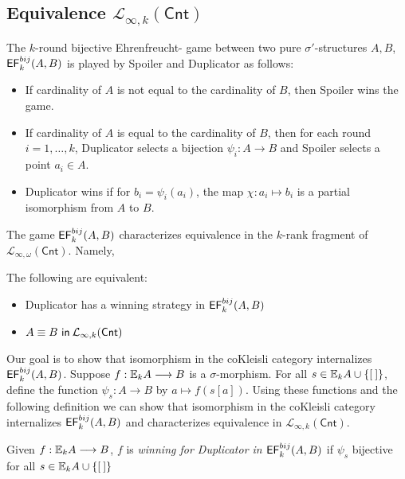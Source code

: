 \subsection{Equivalence $\mathcal{L}_{\infty,k}(\mathsf{Cnt})$} 
The $k$-round bijective Ehrenfreucht-{\Fraisse} game between two pure $\sigma'$-structures $A,B$, ${\mathsf{EF}^{bij}_{k}(A,B)}$ is played by Spoiler and Duplicator as follows:
\begin{itemize}
\item If cardinality of $A$ is not equal to the cardinality of $B$, then Spoiler wins the game.
\item If cardinality of $A$ is equal to the cardinality of $B$, then for each round $i = 1,\dots,k$, Duplicator selects a bijection $\psi_{i}:A \longrightarrow B$ and Spoiler selects a point $a_{i} \in A$. 
\item Duplicator wins if for $b_{i} = \psi_{i}(a_{i})$, the map $\chi:a_{i} \mapsto b_{i}$ is a partial isomorphism from $A$ to $B$. 
\end{itemize}
The game ${\mathsf{EF}^{bij}_{k}(A,B)}$ characterizes equivalence in the $k$-rank fragment of $\mathcal{L}_{\infty,\omega}(\mathsf{Cnt})$. Namely,
\begin{prop}
The following are equivalent: 
\begin{itemize}
\item Duplicator has a winning strategy in ${\mathsf{EF}^{bij}_{k}(A,B)}$ 
\item ${A \equiv B \ \mathsf{in}\: \mathcal{L}_{\infty,k}(\mathsf{Cnt})}$ 
\end{itemize}
\label{prop:bijToSyntaxEF}
\end{prop}
Our goal is to show that isomorphism in the coKleisli category internalizes ${\mathsf{EF}^{bij}_{k}(A,B)}$. Suppose $f:{\mathbb{E}_{k}A} \longrightarrow B$ is a $\sigma$-morphism. For all $s \in {\mathbb{E}_{k}A} \cup \{{[\:]}\}$, define the function $\psi_{s}:A \longrightarrow B$ by $a \mapsto f(s[a])$. Using these functions and the following definition we can show that isomorphism in the coKleisli category internalizes ${\mathsf{EF}^{bij}_{k}(A,B)}$ and characterizes equivalence in $\mathcal{L}_{\infty,k}(\mathsf{Cnt})$.
\begin{defn}
Given $f:{\mathbb{E}_{k}A} \longrightarrow B$, $f$ is \textit{winning for Duplicator in ${\mathsf{EF}^{bij}_{k}(A,B)}$} if $\psi_{s}$ bijective for all $s \in {\mathbb{E}_{k}A} \cup \{{[\:]}\}$ 
\end{defn}
